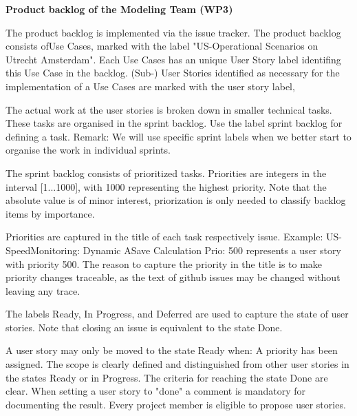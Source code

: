 \textbf{Product backlog of the Modeling Team (WP3)}

The product backlog is implemented via the issue tracker.
The product backlog consists ofUse Cases, marked with the label "US-Operational Scenarios on Utrecht Amsterdam".
Each Use Cases has an unique User Story label identifing this Use Case in the backlog.
(Sub-) User Stories identified as necessary for the implementation of a Use Cases are marked with the user story label,

The actual work at the user stories is broken down in smaller technical tasks. These tasks are organised in the sprint backlog. Use the label sprint backlog for defining a task.
Remark: We will use specific sprint labels when we better start to organise the work in individual sprints.

The sprint backlog consists of prioritized tasks. Priorities are integers in the interval [1...1000], with 1000 representing the highest priority. Note that the absolute value is of minor interest, priorization is only needed to classify backlog items by importance.

Priorities are captured in the title of each task respectively issue. Example: US-SpeedMonitoring: Dynamic ASave Calculation Prio: 500 represents a user story with priority 500. The reason to capture the priority in the title is to make priority changes traceable, as the text of github issues may be changed without leaving any trace.

The labels Ready, In Progress, and Deferred are used to capture the state of user stories. Note that closing an issue is equivalent to the state Done.

A user story may only be moved to the state Ready when:
	A priority has been assigned.
	The scope is clearly defined and distinguished from other user stories in the states Ready or in Progress.
	The criteria for reaching the state Done are clear.
	When setting a user story to "done" a comment is mandatory for documenting the result.
	Every project member is eligible to propose user stories.

